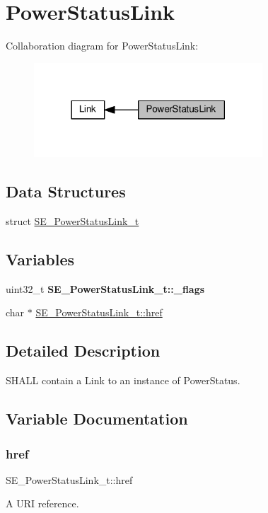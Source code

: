 \hypertarget{group__PowerStatusLink}{}\section{Power\+Status\+Link}
\label{group__PowerStatusLink}
Collaboration diagram for Power\+Status\+Link\+:\nopagebreak
\begin{figure}[H]
\begin{center}
\leavevmode
\includegraphics[width=242pt]{group__PowerStatusLink}
\end{center}
\end{figure}
\subsection*{Data Structures}
\begin{DoxyCompactItemize}
\item 
struct \hyperlink{structSE__PowerStatusLink__t}{S\+E\+\_\+\+Power\+Status\+Link\+\_\+t}
\end{DoxyCompactItemize}
\subsection*{Variables}
\begin{DoxyCompactItemize}
\item 
\mbox{\label{group__PowerStatusLink_gaf029a27e47b86de5a227aa23d0f63761}} 
uint32\+\_\+t {\bfseries S\+E\+\_\+\+Power\+Status\+Link\+\_\+t\+::\+\_\+flags}
\item 
char $\ast$ \hyperlink{group__PowerStatusLink_ga82f194c75d26e2bb601357ecf4549fd8}{S\+E\+\_\+\+Power\+Status\+Link\+\_\+t\+::href}
\end{DoxyCompactItemize}


\subsection{Detailed Description}
S\+H\+A\+LL contain a Link to an instance of Power\+Status. 

\subsection{Variable Documentation}
\mbox{\label{group__PowerStatusLink_ga82f194c75d26e2bb601357ecf4549fd8}} 
\subsubsection{\texorpdfstring{href}{href}}
{\footnotesize\ttfamily S\+E\+\_\+\+Power\+Status\+Link\+\_\+t\+::href}

A U\+RI reference. 